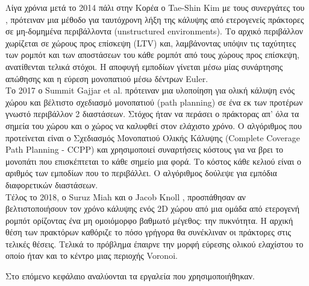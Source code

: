 	Λίγα χρόνια μετά το 2014 πάλι στην Κορέα ο Tae-Shin Kim με τους συνεργάτες του \cite{Kim2014}, πρότειναν μια μέθοδο για ταυτόχρονη λήξη της κάλυψης από ετερογενείς πράκτορες σε μη-δομημένα περιβάλλοντα (unstructured environments). Το αρχικό περιβάλλον χωρίζεται σε χώρους προς επίσκεψη (LTV) και, λαμβάνοντας υπόψιν τις ταχύτητες των ρομπότ και των αποστάσεων του κάθε ρομπότ από τους χώρους προς επίσκεψη, ανατίθενται τελικά στόχοι. Η αποφυγή εμποδίων γίνεται μέσω μίας συνάρτησης απώθησης και η εύρεση μονοπατιού μέσω δέντρων Euler. \\

	Το 2017 ο Summit Gajjar et al. \cite{Gajjar2018} πρότειναν μια υλοποίηση για ολική κάλυψη ενός χώρου και βέλτιστο σχεδιασμό μονοπατιού (path planning) σε ένα εκ των προτέρων γνωστό περιβάλλον 2 διαστάσεων. Στόχος ήταν να περάσει ο πράκτορας απ' όλα τα σημεία του χώρου και ο χώρος να καλυφθεί στον ελάχιστο χρόνο. Ο αλγόριθμος που προτείνεται είναι ο Σχεδιασμός Μονοπατιού Ολικής Κάλυψης (Complete Coverage Path Planning - CCPP) και χρησιμοποιεί συναρτήσεις κόστους για να βρει το μονοπάτι που επισκέπτεται το κάθε σημείο μια φορά. Το κόστος κάθε κελιού είναι ο αριθμός των εμποδίων που το περιβάλλει. Ο αλγόριθμος δούλεψε για εμπόδια διαφορετικών διαστάσεων. \\ 	

	Τέλος το 2018, ο Suruz Miah και ο Jacob Knoll \cite{Miah2018}, προσπάθησαν αν βελτιστοποιήσουν τον χρόνο κάλυψης ενός 2D χώρου από μια ομάδα από ετερογενή ρομπότ ορίζοντας ένα μη ομοιόμορφο βαθμωτό μέγεθος: την πυκνότητα. Η αρχική θέση των πρακτόρων καθόριζε το πόσο γρήγορα θα συνέκλιναν οι πράκτορες στις τελικές θέσεις. Τελικά το πρόβλημα έπαιρνε την μορφή εύρεσης ολικού ελαχίστου το οποίο ήταν και το κέντρο μιας περιοχής Voronoi.
	
	Στο επόμενο κεφάλαιο αναλύονται τα εργαλεία που χρησιμοποιήθηκαν.
